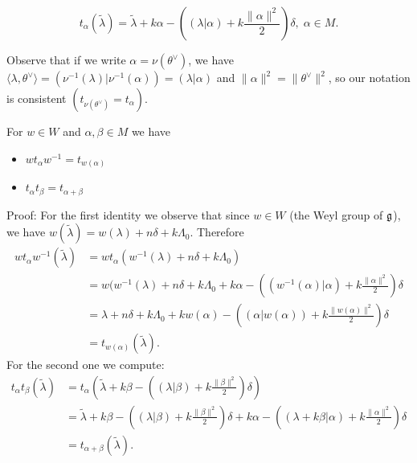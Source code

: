\begin{itemize}
\begin{notation}
\begin{equation}
        t_\alpha(\widetilde{\lambda})=\widetilde{\lambda}+k\alpha-((\lambda|\alpha)+k\frac{\|\alpha\|^2}{2})\delta,\;\alpha\in M.
    \end{equation}
\end{notation}
Observe that if we write $\alpha=\nu(\theta^\vee)$, we have $\langle\lambda,\theta^\vee\rangle = (\nu^{-1}(\lambda)|\nu^{-1}(\alpha))=(\lambda|\alpha)$
and $\|\alpha\|^2=\|\theta^\vee\|^2$, so our notation is consistent $(t_{\nu(\theta^\vee)}=t_\alpha)$.
\begin{dang}
    \begin{lemma}
        For $w\in W$ and $\alpha,\beta\in M$ we have 
        \begin{itemize}
            \item[(1)] $wt_\alpha w^{-1}=t_{w(\alpha)}$
            \item[(2)] $t_{\alpha}t_\beta=t_{\alpha+\beta}$
        \end{itemize}
    \end{lemma}
\end{dang}
Proof: For the first identity we observe that since $w\in W$ (the Weyl group of $\mathfrak{g}$), we have 
$w(\widetilde{\lambda})=w(\lambda)+n\delta+k\Lambda_0$. Therefore
\begin{equation}
    \begin{split}
        wt_\alpha w^{-1}(\widetilde{\lambda})&=wt_\alpha(w^{-1}(\lambda)+n\delta+k\Lambda_0)\\
        &=w(w^{-1}(\lambda)+n\delta+k\Lambda_0+k\alpha-((w^{-1}(\alpha)|\alpha)+k\frac{\|\alpha\|^2}{2})\delta\\
        &=\lambda+n\delta+k\Lambda_0+kw(\alpha)-((\alpha|w(\alpha))+k\frac{\|w(\alpha)\|^2}{2})\delta\\
        &=t_{w(\alpha)}(\widetilde{\lambda}).
    \end{split}
\end{equation}
For the second one we compute:
\begin{equation}
    \begin{split}
        t_\alpha t_\beta(\widetilde{\lambda})&
        =t_\alpha(\widetilde{\lambda}+k\beta-((\lambda|\beta)+k\frac{\|\beta\|^2}{2})\delta)\\
        &=\widetilde{\lambda}+k\beta -((\lambda|\beta)
        +k\frac{\|\beta\|^2}{2})\delta+k\alpha - ((\lambda+k\beta|\alpha)+k\frac{\|\alpha\|^2}{2})\delta \\
        &=t_{\alpha+\beta}(\widetilde{\lambda}).
    \end{split}
\end{equation}


\end{itemize}
